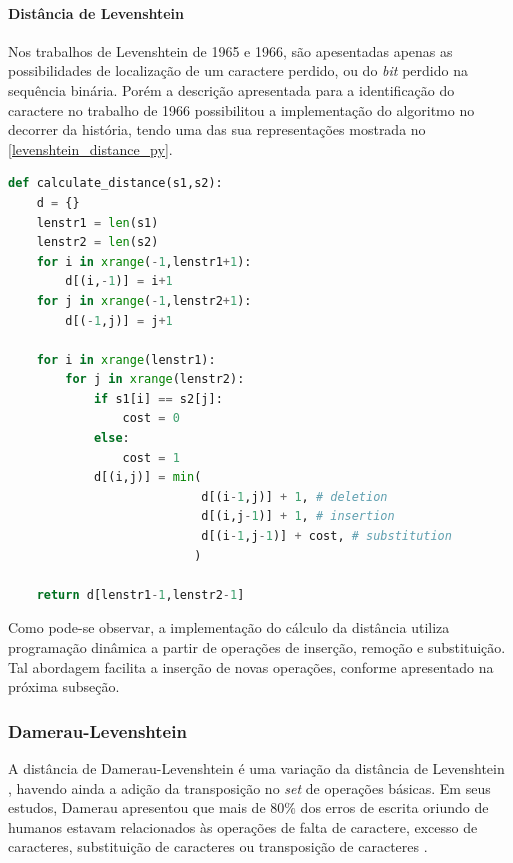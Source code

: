 \paragraph*{Distância de Levenshtein}
\label{sub:algoritmo_da_distancia}

Nos trabalhos de Levenshtein de 1965 e 1966, são apesentadas apenas as possibilidades de localização de um caractere perdido, ou do \textit{bit} perdido na sequência binária. Porém a descrição apresentada para a identificação do caractere no trabalho de 1966 \cite{levenshtein1966} possibilitou a implementação do algoritmo no decorrer da história, tendo uma das sua representações mostrada no \autoref{levenshtein_distance_py}.

\begin{lstlisting}[language=Python,label=levenshtein_distance_py,caption={Implementação da distância de Levenshtein}]
def calculate_distance(s1,s2):
    d = {}
    lenstr1 = len(s1)
    lenstr2 = len(s2)
    for i in xrange(-1,lenstr1+1):
        d[(i,-1)] = i+1
    for j in xrange(-1,lenstr2+1):
        d[(-1,j)] = j+1
 
    for i in xrange(lenstr1):
        for j in xrange(lenstr2):
            if s1[i] == s2[j]:
                cost = 0
            else:
                cost = 1
            d[(i,j)] = min(
                           d[(i-1,j)] + 1, # deletion
                           d[(i,j-1)] + 1, # insertion
                           d[(i-1,j-1)] + cost, # substitution
                          )

    return d[lenstr1-1,lenstr2-1]
\end{lstlisting}

Como pode-se observar, a implementação do cálculo da distância utiliza programação dinâmica a partir de operações de inserção, remoção e substituição. Tal abordagem facilita a inserção de novas operações, conforme apresentado na próxima subseção.

\subsubsection*{Damerau-Levenshtein} %
\label{sec:damerau_levenshtein}

A distância de Damerau-Levenshtein é uma variação da distância de Levenshtein \cite{levenshtein1965}, havendo ainda a adição da transposição no \textit{set} de operações básicas. Em seus estudos, Damerau apresentou que mais de $80\%$ dos erros de escrita oriundo de humanos estavam relacionados às operações de falta de caractere, excesso de caracteres, substituição de caracteres ou transposição de caracteres \cite{damerau1964technique}.



